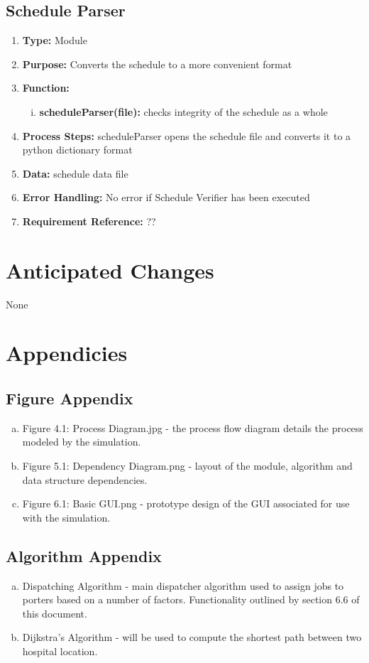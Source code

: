 \documentclass[paper=letter, fontsize=10pt]{scrartcl}
\numberwithin{equation}{section}		%
\numberwithin{figure}{section}			%
\numberwithin{table}{section}				%
\begin{document}
\subsection{Schedule Parser}
\begin{enumerate}[]
	\item \textbf{Type:} Module
	\item \textbf{Purpose:} Converts the schedule to a more convenient format
	\item \textbf{Function:} 
	\begin{enumerate}[(i)]
		\item \textbf{scheduleParser(file):} checks integrity of the schedule as a whole
	\end{enumerate}
	\item \textbf{Process Steps:} scheduleParser opens the schedule file and converts it to a python dictionary format
	\item \textbf{Data:} schedule data file
	\item \textbf{Error Handling:} No error if Schedule Verifier has been executed
	\item \textbf{Requirement Reference:} ??
\end{enumerate}

\section{Anticipated Changes}
None

\section{Appendicies}
\subsection{Figure Appendix}
\begin{enumerate}[(a)]
	\item Figure 4.1: Process Diagram.jpg - the process flow diagram details the process modeled by the simulation.
	\item Figure 5.1: Dependency Diagram.png - layout of the module, algorithm and data structure dependencies.
	\item Figure 6.1: Basic GUI.png - prototype design of the GUI associated for use with the simulation.
\end{enumerate}
\subsection{Algorithm Appendix}
\begin{enumerate}[(a)]
	\item Dispatching Algorithm - main dispatcher algorithm used to assign jobs to porters based on a number of factors. Functionality outlined by section 6.6 of this document.
	\item Dijkstra's Algorithm - will be used to compute the shortest path between two hospital location.
\end{enumerate}

\end{document}
